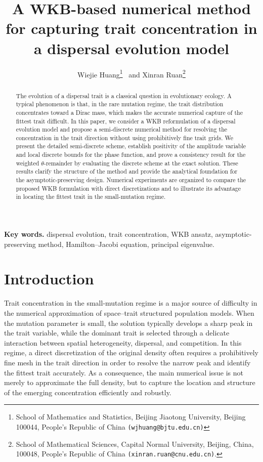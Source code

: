 \documentclass[11pt, dina4, amsfont12]{article}
\title{A WKB-based numerical method for capturing trait concentration in a dispersal evolution model}
\author{
Wiejie Huang\thanks{School of Mathematics and Statistics, Beijing Jiaotong University, Beijing 100044, People's Republic of China {\tt (wjhuang@bjtu.edu.cn)}} \ and
Xinran Ruan\thanks{School of Mathematical Sciences, Capital Normal University, Beijing, China, 100048, People's Republic of China {\tt (xinran.ruan@cnu.edu.cn)}.}
}
\begin{document}
\date{}
\maketitle

\begin{abstract}
The evolution of a dispersal trait is a classical question in evolutionary ecology. A typical phenomenon is that, in the rare mutation regime, the trait distribution concentrates toward a Dirac mass, which makes the accurate numerical capture of the fittest trait difficult. In this paper, we consider a WKB reformulation of a dispersal evolution model and propose a semi-discrete numerical method for resolving the concentration in the trait direction without using prohibitively fine trait grids. We present the detailed semi-discrete scheme, establish positivity of the amplitude variable and local discrete bounds for the phase function, and prove a consistency result for the weighted $\theta$-remainder by evaluating the discrete scheme at the exact solution. These results clarify the structure of the method and provide the analytical foundation for the asymptotic-preserving design. Numerical experiments are organized to compare the proposed WKB formulation with direct discretizations and to illustrate its advantage in locating the fittest trait in the small-mutation regime.
\end{abstract}

{\bf Key words. } dispersal evolution, trait concentration, WKB ansatz, asymptotic-preserving method, Hamilton--Jacobi equation, principal eigenvalue.


\section{Introduction}

Trait concentration in the small-mutation regime is a major source of difficulty in the numerical approximation of space--trait structured population models. When the mutation parameter is small, the solution typically develops a sharp peak in the trait variable, while the dominant trait is selected through a delicate interaction between spatial heterogeneity, dispersal, and competition. In this regime, a direct discretization of the original density often requires a prohibitively fine mesh in the trait direction in order to resolve the narrow peak and identify the fittest trait accurately. As a consequence, the main numerical issue is not merely to approximate the full density, but to capture the location and structure of the emerging concentration efficiently and robustly.
\end{document}
